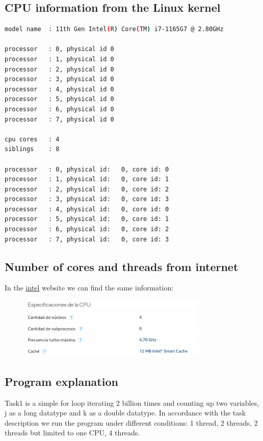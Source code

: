 \documentclass[11pt,a4paper]{article}
\begin{document}
\subsection{CPU information from the Linux kernel}
\begin{lstlisting}[language=bash]
model name	: 11th Gen Intel(R) Core(TM) i7-1165G7 @ 2.80GHz

processor	: 0, physical id 0
processor	: 1, physical id 0
processor	: 2, physical id 0
processor	: 3, physical id 0
processor	: 4, physical id 0
processor	: 5, physical id 0
processor	: 6, physical id 0
processor	: 7, physical id 0

cpu cores	: 4
siblings	: 8

processor	: 0, physical id:	0, core id: 0
processor	: 1, physical id:	0, core id: 1
processor	: 2, physical id:	0, core id: 2
processor	: 3, physical id:	0, core id: 3
processor	: 4, physical id:	0, core id: 0
processor	: 5, physical id:	0, core id: 1
processor	: 6, physical id:	0, core id: 2
processor	: 7, physical id:	0, core id: 3
\end{lstlisting}
\subsection{Number of cores and threads from internet}
In the \href{https://ark.intel.com/content/www/es/es/ark/products/208662/intel-core-i71165g7-processor-12m-cache-up-to-4-70-ghz.html}{intel} website we can find the same information:
\begin{figure}[h]
\centering
\includegraphics[width=0.8\textwidth]{foto/intel.png}
\end{figure}
\subsection{Program explanation}
Task1 is a simple for loop iterating 2 billion times and counting up two variables, j as a long datatype and k as a double datatype. 
In accordance with the task description we run the program under different conditions: 1 thread, 2 threads, 2 threads but limited to one CPU, 4 threads.
\end{document}
